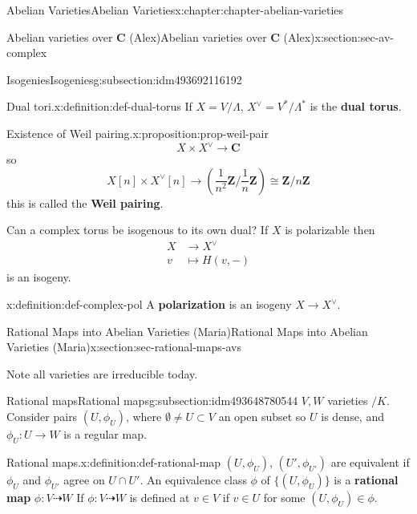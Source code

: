 \documentclass[oneside,10pt,]{book}
\newcommand{\terminology}[1]{\textbf{#1}}
\numberwithin{equation}{section}
\newcommand{\ZZ}{\mathbf{Z}}
\newcommand{\CC}{\mathbf{C}}
\newcommand{\amp}{&}
\begin{document}
\begin{chapterptx}{Abelian Varieties}{}{Abelian Varieties}{}{}{x:chapter:chapter-abelian-varieties}
\begin{sectionptx}{Abelian varieties over \(\CC\) (Alex)}{}{Abelian varieties over \(\CC\) (Alex)}{}{}{x:section:sec-av-complex}
\begin{subsectionptx}{Isogenies}{}{Isogenies}{}{}{g:subsection:idm493692116192}
\begin{definition}{Dual tori.}{x:definition:def-dual-torus}%
If \(X = V/\Lambda\), \(X^\vee = V^*/ \Lambda^*\) is the \terminology{dual torus}.%
\end{definition}
\begin{proposition}{Existence of Weil pairing.}{}{x:proposition:prop-weil-pair}%
%
\begin{equation*}
X\times X^\vee \to \CC
\end{equation*}
so%
\begin{equation*}
X[n] \times X^\vee[n] \to \left(\frac{1}{n^2} \ZZ/\frac{1}{n} \ZZ\right) \cong \ZZ/n\ZZ
\end{equation*}
this is called the \terminology{Weil pairing}.%
\end{proposition}
Can a complex torus be isogenous to its own dual? If \(X\) is polarizable then%
\begin{align*}
X \amp\to X^\vee\\
v\amp\mapsto H(v,-)
\end{align*}
is an isogeny.%
\begin{definition}{}{x:definition:def-complex-pol}%
A \terminology{polarization} is an isogeny \(X \to X^\vee\).%
\end{definition}
\end{subsectionptx}
\end{sectionptx}
%
%
\typeout{************************************************}
\typeout{************************************************}
%
\begin{sectionptx}{Rational Maps into Abelian Varieties (Maria)}{}{Rational Maps into Abelian Varieties (Maria)}{}{}{x:section:sec-rational-maps-avs}
\begin{introduction}{}%
Note all varieties are irreducible today.%
\end{introduction}%
%
%
\typeout{************************************************}
\typeout{************************************************}
%
\begin{subsectionptx}{Rational maps}{}{Rational maps}{}{}{g:subsection:idm493648780544}
\(V,W\) varieties \(/K\). Consider pairs \((U,\phi_U)\), where \(\emptyset \ne  U \subset V\) an open subset so \(U\) is dense, and \(\phi_U \colon U \to W\) is a regular map.%
\begin{definition}{Rational maps.}{x:definition:def-rational-map}%
\((U,\phi_U)\), \((U',{\phi_{U'}})\) are equivalent if \(\phi_U\) and \(\phi_{U'}\) agree on \(U \cap U'\). An equivalence class \(\phi\) of \(\{(U, \phi_U)\}\) is a \terminology{rational map} \(\phi \colon V \dashrightarrow W\) If \(\phi\colon V \dashrightarrow W\) is defined at   \(v\in V\) if \(v\in U\) for some \((U,\phi_U) \in \phi\).%

\end{definition}
\end{subsectionptx}
\end{sectionptx}
\end{chapterptx}
\end{document}

